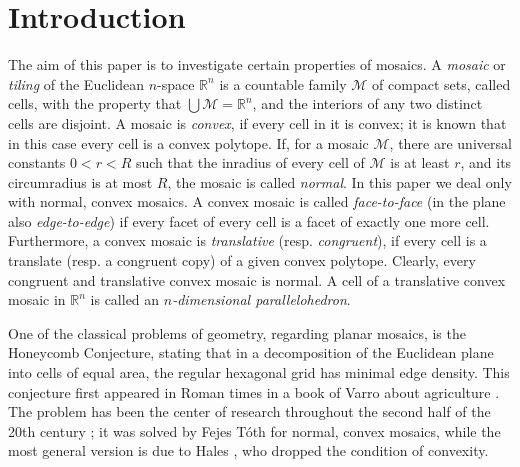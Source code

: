 \documentclass[twoside]{amsart}
\theoremstyle{definition}
\renewcommand{\Re}{\mathbb R}
\newcommand{\M}{\mathcal{M}}
\begin{document}
\maketitle

\section{Introduction}

The aim of this paper is to investigate certain properties of mosaics. A \emph{mosaic} or \emph{tiling} of the Euclidean $n$-space $\Re^n$ is a countable family $\M$ of compact sets, called cells, with the property that $\bigcup \M = \Re^n$, and the interiors of any two distinct cells are disjoint. A mosaic is \emph{convex}, if every cell in it is convex; it is known that in this case every cell is a convex polytope. If, for a mosaic $\M$, there are universal constants $0 < r < R$ such that the inradius of every cell of $\M$ is at least $r$, and its circumradius is at most $R$, the mosaic is called \emph{normal}. In this paper we deal only with normal, convex mosaics. A convex mosaic is called \emph{face-to-face} (in the plane also \emph{edge-to-edge}) if every facet of every cell is a facet of exactly one more cell. Furthermore, a convex mosaic is \emph{translative} (resp. \emph{congruent}), if every cell is a translate (resp. a congruent copy) of a given convex polytope. Clearly, every congruent and translative convex mosaic is normal. A cell of a translative convex mosaic in $\Re^n$ is called an \emph{$n$-dimensional parallelohedron}.

One of the classical problems of geometry, regarding planar mosaics, is the Honeycomb Conjecture, stating that in a decomposition of the Euclidean plane into cells of equal area, the regular hexagonal grid has minimal edge density. This conjecture first appeared in Roman times in a book of Varro about agriculture \cite{Varro}. The problem has been the center of research throughout the second half of the 20th century \cite{LFT, Morgan}; it was solved by Fejes T\'oth for normal, convex mosaics, while the most general version is due to Hales \cite{Hales1}, who dropped the condition of convexity.
\end{document}
